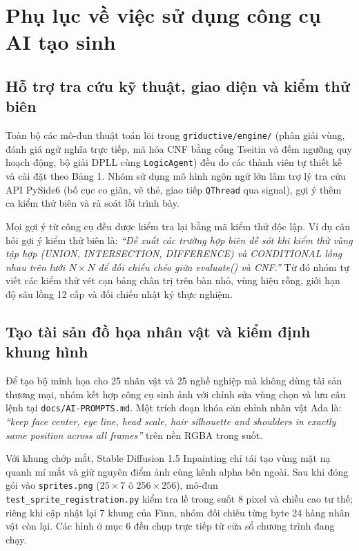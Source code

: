 \begingroup{}
\section{Phụ lục về việc sử dụng công cụ AI tạo sinh}

\subsection{Hỗ trợ tra cứu kỹ thuật, giao diện và kiểm thử biên}

Toàn bộ các mô-đun thuật toán lõi trong \texttt{griductive/engine/} (phân giải vùng, đánh giá ngữ nghĩa trực tiếp, mã hóa CNF bằng cổng Tseitin và đếm ngưỡng quy hoạch động, bộ giải DPLL cùng \texttt{LogicAgent}) đều do các thành viên tự thiết kế và cài đặt theo Bảng 1. Nhóm sử dụng mô hình ngôn ngữ lớn làm trợ lý tra cứu API PySide6 (bố cục co giãn, vẽ thẻ, giao tiếp \texttt{QThread} qua signal), gợi ý thêm ca kiểm thử biên và rà soát lỗi trình bày.

Mọi gợi ý từ công cụ đều được kiểm tra lại bằng mã kiểm thử độc lập. Ví dụ câu hỏi gợi ý kiểm thử biên là: \emph{“Đề xuất các trường hợp biên dễ sót khi kiểm thử vùng tập hợp (UNION, INTERSECTION, DIFFERENCE) và CONDITIONAL lồng nhau trên lưới $N\times N$ để đối chiếu chéo giữa evaluate() và CNF.”} Từ đó nhóm tự viết các kiểm thử vét cạn bảng chân trị trên bàn nhỏ, vùng hiệu rỗng, giới hạn độ sâu lồng 12 cấp và đối chiếu nhật ký thực nghiệm.

\subsection{Tạo tài sản đồ họa nhân vật và kiểm định khung hình}

Để tạo bộ minh họa cho 25 nhân vật và 25 nghề nghiệp mà không dùng tài sản thương mại, nhóm kết hợp công cụ sinh ảnh với chỉnh sửa vùng chọn và lưu câu lệnh tại \texttt{docs/AI-PROMPTS.md}. Một trích đoạn khóa căn chỉnh nhân vật Ada là: \emph{“keep face center, eye line, head scale, hair silhouette and shoulders in exactly same position across all frames”} trên nền RGBA trong suốt.

Với khung chớp mắt, Stable Diffusion 1.5 Inpainting \cite{inpainting} chỉ tái tạo vùng mặt nạ quanh mí mắt và giữ nguyên điểm ảnh cùng kênh alpha bên ngoài. Sau khi đóng gói vào \texttt{sprites.png} ($25\times7$ ô $256\times256$), mô-đun \texttt{test\_sprite\_registration.py} kiểm tra lề trong suốt 8 pixel và chiều cao tư thế; riêng khi cập nhật lại 7 khung của Finn, nhóm đối chiếu từng byte 24 hàng nhân vật còn lại. Các hình ở mục 6 đều chụp trực tiếp từ cửa sổ chương trình đang chạy.

